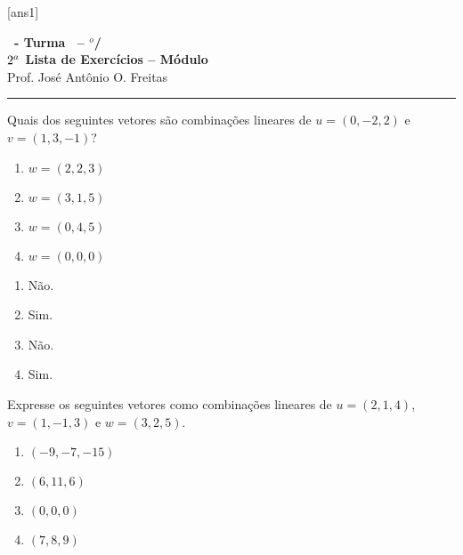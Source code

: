 \documentclass[12pt]{exam}
\begin{document}
  [ans1]
  \begin{center}
    {\Large\bf \disciplina\ - Turma \turma\ -- \semestre$^{o}$/\ano} \\ \vspace{9pt} {\large\bf
        $2^a$ Lista de Exercícios -- Módulo \numeromodulo}\\ \vspace{9pt} Prof. José Antônio O. Freitas
  \end{center}
  \hrule


\begin{exercicio}
    Quais dos seguintes vetores são combinações lineares de $u = (0, -2, 2)$ e $v = (1, 3, -1)$?
    \begin{multicols}{2}
        \begin{enumerate}[label={\alph*})]
            \item $w = (2, 2, 3)$

            \item $w = (3, 1, 5)$

            \item $w = (0, 4, 5)$

            \item $w = (0, 0, 0)$
        \end{enumerate}
    \end{multicols}
    \begin{solucao}
      \begin{multicols}{2}
        \begin{enumerate}[label={\alph*})]
          \item Não.

          \item Sim.

          \item Não.

          \item Sim.
        \end{enumerate}
      \end{multicols}
    \end{solucao}
\end{exercicio}

\begin{exercicio}
    Expresse os seguintes vetores como combinações lineares de $u = (2, 1, 4)$, $v = (1, -1, 3)$ e $w = (3, 2, 5)$.
    \begin{multicols}{2}
        \begin{enumerate}[label={\alph*})]
            \item $(-9, -7, -15)$

            \item $(6, 11, 6)$

            \item $(0, 0, 0)$

            \item $(7, 8, 9)$
        \end{enumerate}
    \end{multicols}
\end{exercicio}
\end{document}
